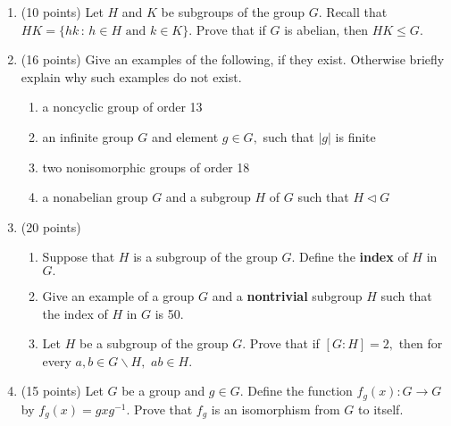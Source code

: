 \documentclass[12pt]{article}
\renewcommand{\emph}[1]{\textsf{\textbf{#1}}}
\begin{document}
\newpage
\begin{enumerate}
\item (10 points) Let $H$ and $K$ be subgroups of the group $G.$ Recall that $HK=\{hk \, : \, h \in H \text{ and } k \in K \}.$ Prove that {if $G$ is abelian}, then $HK \leq G.$\\
\vfill
\newpage

\item (16 points) Give an examples of the following, if they exist. Otherwise briefly explain why such examples do not exist.
	\begin{enumerate}
	\item a noncyclic group of order 13
	\vfill
	\item an infinite group $G$ and element $g \in G,$ such that $|g|$ is finite
	\vfill
	\item two nonisomorphic groups of order 18
	\vfill
	\item a nonabelian group $G$ and a subgroup $H$ of $G$ such that $H \lhd G$
	\vfill
	\end{enumerate}
\newpage

\item (20 points) 
	\begin{enumerate}
	\item Suppose that $H$ is a subgroup of the group $G$. Define the \emph{index} of $H$ in $G.$
	\vspace{1in}
	\item Give an example of a group $G$ and a \emph{nontrivial} subgroup $H$ such that the index of $H$ in $G$ is 50.
	\vspace{1in}
	\item Let $H$ be a subgroup of the group $G.$ Prove that if $[G : H]=2,$ then for every $a,b \in G\backslash H,$ $ab \in H.$\\	
	\end{enumerate}
\newpage
\item (15 points)  Let $G$ be a group and $g \in G.$ Define the function $f_g(x) : G \to G$ by $f_g(x)=gxg^{-1}.$ Prove that $f_g$ is an isomorphism from $G$ to itself.

\newpage

\vfill


\end{enumerate}
\end{document}
